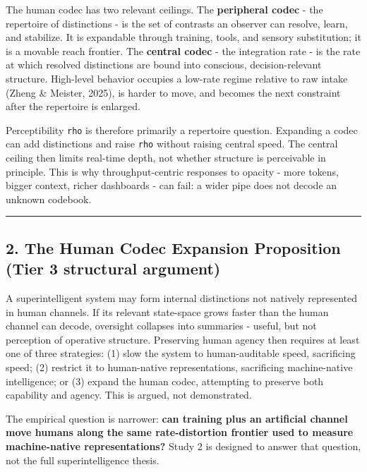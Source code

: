 \documentclass[
  11pt,
]{article}
\begin{document}
The human codec has two relevant ceilings. The
\textbf{peripheral codec} - the repertoire of
distinctions - is the set of contrasts an
observer can resolve, learn, and stabilize. It
is expandable through training, tools, and
sensory substitution; it is a movable reach
frontier. The \textbf{central codec} - the
integration rate - is the rate at which resolved
distinctions are bound into conscious,
decision-relevant structure. High-level behavior
occupies a low-rate regime relative to raw
intake (Zheng \& Meister, 2025), is harder to
move, and becomes the next constraint after the
repertoire is enlarged.

Perceptibility \texttt{rho} is therefore
primarily a repertoire question. Expanding a
codec can add distinctions and raise
\texttt{rho} without raising central speed. The
central ceiling then limits real-time depth, not
whether structure is perceivable in principle.
This is why throughput-centric responses to
opacity - more tokens, bigger context, richer
dashboards - can fail: a wider pipe does not
decode an unknown codebook.

\begin{center}\rule{0.5\linewidth}{0.5pt}\end{center}

\subsection{2. The Human Codec Expansion
Proposition (Tier 3 structural
argument)}\label{the-human-codec-expansion-proposition-tier-3-structural-argument}

A superintelligent system may form internal
distinctions not natively represented in human
channels. If its relevant state-space grows
faster than the human channel can decode,
oversight collapses into summaries - useful, but
not perception of operative structure.
Preserving human agency then requires at least
one of three strategies: (1) slow the system to
human-auditable speed, sacrificing speed; (2)
restrict it to human-native representations,
sacrificing machine-native intelligence; or (3)
expand the human codec, attempting to preserve
both capability and agency. This is argued, not
demonstrated.

The empirical question is narrower: \textbf{can
training plus an artificial channel move humans
along the same rate-distortion frontier used to
measure machine-native representations?} Study 2
is designed to answer that question, not the
full superintelligence thesis.
\end{document}
